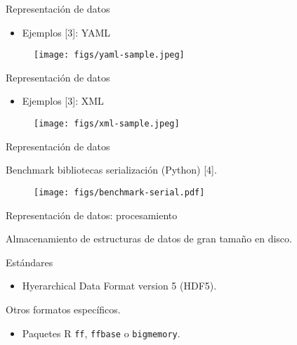 
\begin{frame}{Representación de datos}
\begin{itemize}
 \item Ejemplos [3]: YAML
\end{itemize}

 \begin{figure}
  \centering
  \texttt{[image: figs/yaml-sample.jpeg]} 
\end{figure}

\end{frame}


\begin{frame}{Representación de datos}
\begin{itemize}
 \item Ejemplos [3]: XML
\end{itemize}

 \begin{figure}
  \centering
  \texttt{[image: figs/xml-sample.jpeg]} 
\end{figure}

\end{frame}


\begin{frame}{Representación de datos}
\begin{wideitemize}
 \item Benchmark bibliotecas serialización (Python) [4].
\end{wideitemize}

 \begin{figure}
  \centering
  \texttt{[image: figs/benchmark-serial.pdf]} 
\end{figure}

\end{frame}


\begin{frame}{Representación de datos: procesamiento}
 \begin{wideitemize}
  \item Almacenamiento de estructuras de datos de gran tamaño en disco.
  
  \item Estándares
  \begin{itemize}
   \item Hyerarchical Data Format version 5 (HDF5).
  \end{itemize}
  
  \item Otros formatos específicos.
  \begin{itemize}
   \item Paquetes R \texttt{ff}, \texttt{ffbase} o \texttt{bigmemory}.
  \end{itemize}


 \end{wideitemize}

\end{frame}

